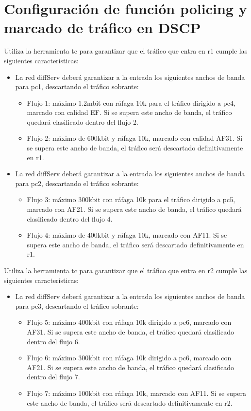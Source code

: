 \documentclass[12pt, a4paper]{report}
\begin{document}
\section{Configuración de función policing y marcado de tráfico en DSCP}
Utiliza la herramienta tc para garantizar que el tráfico que entra en r1 cumple las siguientes
características:
\begin{itemize}
	\item La red diffServ deberá garantizar a la entrada los siguientes anchos de banda para pc1, descartando el tráfico sobrante:
	\begin{itemize}
		\item Flujo 1: máximo 1.2mbit con ráfaga 10k para el tráfico dirigido a pc4, marcado con calidad
		EF. Si se supera este ancho de banda, el tráfico quedará clasificado dentro del flujo 2.
		\item Flujo 2: máximo de 600kbit y ráfaga 10k, marcado con calidad AF31. Si se supera este
		ancho de banda, el tráfico será descartado definitivamente en r1.
	\end{itemize}
	\item La red diffServ deberá garantizar a la entrada los siguientes anchos de banda para pc2, descartando el tráfico sobrante:
	\begin{itemize}
		\item Flujo 3: máximo 300kbit con ráfaga 10k para el tráfico dirigido a pc5, marcado con AF21.
		Si se supera este ancho de banda, el tráfico quedará clasificado dentro del flujo 4.
		\item Flujo 4: máximo de 400kbit y ráfaga 10k, marcado con AF11. Si se supera este ancho de
		banda, el tráfico será descartado definitivamente en r1.
	\end{itemize}
\end{itemize}
Utiliza la herramienta tc para garantizar que el tráfico que entra en r2 cumple las siguientes
características:
\begin{itemize}
	\item La red diffServ deberá garantizar a la entrada los siguientes anchos de banda para pc3, descartando el tráfico sobrante:
	\begin{itemize}
		\item Flujo 5: máximo 400kbit con ráfaga 10k dirigido a pc6, marcado con AF31. Si se supera
		este ancho de banda, el tráfico quedará clasificado dentro del flujo 6.
		\item Flujo 6: máximo 300kbit con ráfaga 10k dirigido a pc6, marcado con AF21. Si se supera
		este ancho de banda, el tráfico quedará clasificado dentro del flujo 7.
		\item Flujo 7: máximo 100kbit con ráfaga 10k, marcado con AF11. Si se supera este ancho de
		banda, el tráfico será descartado definitivamente en r2.
	\end{itemize}
\end{itemize}
\end{document}
